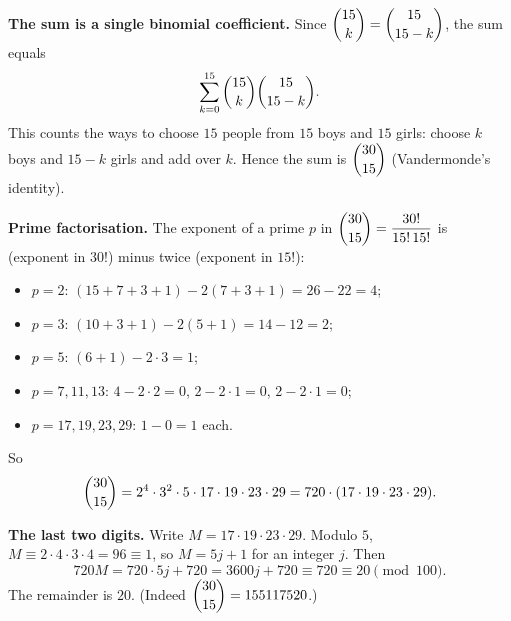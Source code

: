 \textbf{The sum is a single binomial coefficient.} Since $\dbinom{15}{k}=\dbinom{15}{15-k}$, the sum equals
\[\sum_{k=0}^{15}\dbinom{15}{k}\dbinom{15}{15-k}.\]
This counts the ways to choose $15$ people from $15$ boys and $15$ girls: choose $k$ boys and $15-k$ girls and add over $k$. Hence the sum is $\dbinom{30}{15}$ (Vandermonde's identity).

\textbf{Prime factorisation.} The exponent of a prime $p$ in $\dbinom{30}{15}=\dfrac{30!}{15!\,15!}$ is (exponent in $30!$) minus twice (exponent in $15!$):
\begin{itemize}
\item $p=2$: $(15+7+3+1)-2(7+3+1)=26-22=4$;
\item $p=3$: $(10+3+1)-2(5+1)=14-12=2$;
\item $p=5$: $(6+1)-2\cdot3=1$;
\item $p=7,11,13$: $4-2\cdot2=0$, $2-2\cdot1=0$, $2-2\cdot1=0$;
\item $p=17,19,23,29$: $1-0=1$ each.
\end{itemize}
So
\[\dbinom{30}{15}=2^4\cdot3^2\cdot5\cdot17\cdot19\cdot23\cdot29=720\cdot(17\cdot19\cdot23\cdot29).\]

\textbf{The last two digits.} Write $M=17\cdot19\cdot23\cdot29$. Modulo $5$, $M\equiv2\cdot4\cdot3\cdot4=96\equiv1$, so $M=5j+1$ for an integer $j$. Then
\[720M=720\cdot5j+720=3600j+720\equiv720\equiv20\pmod{100}.\]
The remainder is $\boxed{20}$. (Indeed $\dbinom{30}{15}=155117520$.)
